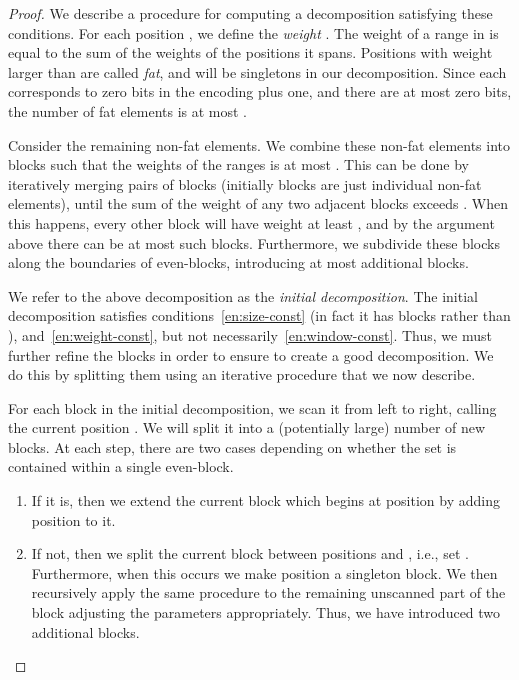 \documentclass[runningheads]{llncs}
\begin{document}
\begin{proof}
We describe a procedure for computing a decomposition satisfying these
conditions.  For each position , we define the
\emph{weight} .  The weight of a range in  is
equal to the sum of the weights of the positions it spans. Positions
with weight larger than  are called \emph{fat}, and will be
singletons in our decomposition.  Since each  corresponds to
 zero bits in the encoding plus one, and there are at most 
zero bits, the number of fat elements is at most .

Consider the remaining non-fat elements.  We combine these non-fat
elements into  blocks such that the weights of the ranges
is at most .  This can be done by iteratively merging pairs of
blocks (initially blocks are just individual non-fat elements), until
the sum of the weight of any two adjacent blocks exceeds .  When
this happens, every other block will have weight at least , and
by the argument above there can be at most  such blocks.
Furthermore, we subdivide these blocks along the boundaries of
even-blocks, introducing at most  additional blocks.  

We refer to the above decomposition as the \emph{initial
  decomposition}.  The initial decomposition satisfies
conditions~\ref{en:size-const} (in fact it has  blocks
rather than ), and~\ref{en:weight-const}, but not
necessarily~\ref{en:window-const}.  Thus, we must further refine the
blocks in order to ensure to create a good decomposition.  We do this by
splitting them using an iterative procedure that we now describe.

For each block  in the
initial decomposition, we scan it from left to right, calling the
current position .  We will split it into a (potentially large)
number of new blocks.  At each step, there are two cases depending on
whether the set  is
contained within a single even-block.  
\begin{enumerate}

\item If it is, then we extend the current block which begins at
  position  by adding position  to it.

\item If not, then we split the current block between positions  and , i.e., set .  Furthermore, when this
  occurs we make position  a singleton block. We then recursively
  apply the same procedure to the remaining unscanned part of the
  block adjusting the parameters appropriately.  Thus, we have
  introduced two additional blocks.
\end{enumerate}


\end{proof}
\end{document}
